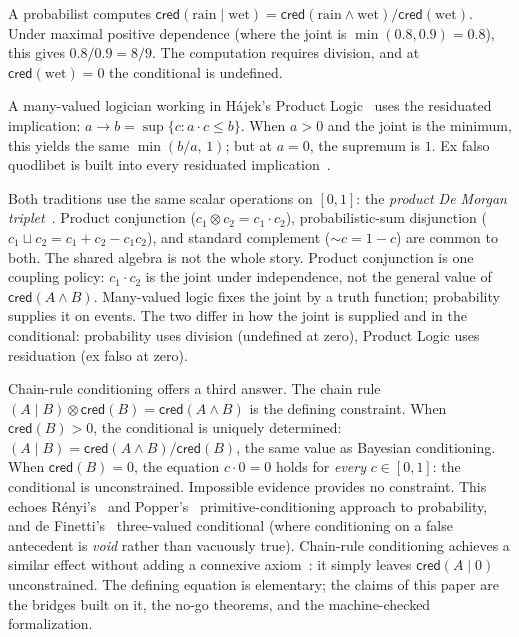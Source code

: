 \documentclass[11pt,a4paper]{article}
\newcommand{\cred}{\mathsf{cred}}
\newcommand{\negc}{\mathord{\sim}}
\newcommand{\conjc}{\otimes}
\newcommand{\disjc}{\sqcup}
\newcommand{\condc}[2]{({#1} \mid {#2})}
\begin{document}
A probabilist computes $\cred(\text{rain} \mid \text{wet})
= \cred(\text{rain} \land \text{wet}) / \cred(\text{wet})$.
Under maximal positive dependence (where the joint is
$\min(0.8, 0.9) = 0.8$), this gives $0.8 / 0.9 = 8/9$.
The computation requires division, and at $\cred(\text{wet}) = 0$
the conditional is undefined.

A many-valued logician working in H\'ajek's Product
Logic~\cite{hajek1998} uses the residuated implication:
$a \to b = \sup\{c : a \cdot c \leq b\}$.
When $a > 0$ and the joint is the minimum, this yields the same
$\min(b/a,\, 1)$; but at $a = 0$, the supremum is $1$.
Ex falso quodlibet is built into every residuated
implication~\cite{hajek1998,esteva2001,cintula2011}.

Both traditions use the same scalar operations on $[0,1]$: the
\emph{product De Morgan triplet}~\cite{klement2000}.
Product conjunction ($c_1 \conjc c_2 = c_1 \cdot c_2$),
probabilistic-sum disjunction
($c_1 \disjc c_2 = c_1 + c_2 - c_1 c_2$), and standard complement
($\negc c = 1 - c$) are common to both.
The shared algebra is not the whole story.  Product conjunction is one
coupling policy: $c_1 \cdot c_2$ is the joint under independence, not
the general value of $\cred(A \land B)$.  Many-valued logic fixes the
joint by a truth function; probability supplies it on events.
The two differ in how the joint is supplied and in the conditional:
probability uses division (undefined at zero), Product Logic uses
residuation (ex falso at zero).

Chain-rule conditioning offers a third answer.
The chain rule
$\condc{A}{B} \conjc \cred(B) = \cred(A \land B)$
is the defining constraint.
When $\cred(B) > 0$, the conditional is uniquely determined:
$\condc{A}{B} = \cred(A \land B) / \cred(B)$, the same
value as Bayesian conditioning.
When $\cred(B) = 0$, the equation $c \cdot 0 = 0$ holds for
\emph{every} $c \in [0,1]$: the conditional is unconstrained.
Impossible evidence provides no constraint.
This echoes R\'enyi's~\cite{renyi1955} and
Popper's~\cite{popper1959} primitive-conditioning approach to
probability, and de Finetti's~\cite{definetti1936} three-valued
conditional (where conditioning on a false antecedent is \emph{void}
rather than vacuously true).
Chain-rule conditioning achieves a similar effect without adding
a connexive axiom~\cite{egre2021}: it simply leaves
$\cred(A \mid 0)$ unconstrained.
The defining equation is elementary; the claims of this paper are
the bridges built on it, the no-go theorems, and the
machine-checked formalization.
\end{document}

